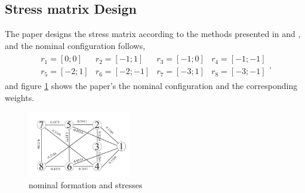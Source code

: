 \subsection{Stress matrix Design} \label{Stress matrix Design}
The paper designs the stress matrix according to the methods presented in \cite{7339680} and \cite{8270608}, and the nominal configuration follows,
\begin{align*}
    \begin{matrix}
        r_1 = [0;0] & r_2 = [-1;1] & r_3 = [-1;0] & r_4 = [-1;-1]\\
        r_5 = [-2;1] & r_6 = [-2;-1] & r_7 = [-3;1] & r_8 = [-3;-1]
    \end{matrix},
\end{align*}
and figure \ref{nominal_formation_and_stresses} shows the paper's the nominal configuration and the corresponding weights. 
\begin{figure}[ht]
    \centering
    \includegraphics*[width=0.4\textwidth]{./img/nominal formation and stresses.png}
    \caption{nominal formation and stresses}
    \label{nominal_formation_and_stresses}
\end{figure}